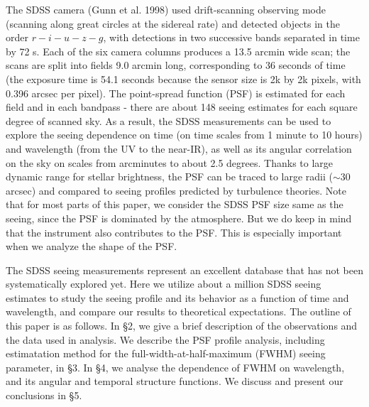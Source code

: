 The SDSS camera (Gunn et al. 1998) used drift-scanning observing mode (scanning along great circles
at the sidereal rate) and detected objects in the order 
$r-i-u-z-g$, with detections in two successive bands separated in time by 72 s. Each of the six camera
columns produces a 13.5 arcmin wide scan; the scans are split into fields 9.0 arcmin long, corresponding
to 36 seconds of time (the exposure time is 54.1 seconds because the sensor size is 2k by 2k pixels,
with 0.396 arcsec per pixel). 
The point-spread function (PSF) is estimated for each field and in each bandpass - there are about 
148 seeing estimates for each square degree of scanned sky. As a result, the SDSS measurements can
be used to explore the seeing dependence on time (on time scales from 1 minute to 10 hours) and 
wavelength (from the UV to the near-IR), as well as its angular correlation on the sky on scales from 
arcminutes to about 2.5 degrees. Thanks to large dynamic range for stellar brightness, the PSF can 
be traced to large radii ($\sim$30 arcsec) and compared to seeing profiles predicted by turbulence
theories. 
Note that for most parts of this paper, we consider the SDSS PSF size
same as the seeing, since the PSF is dominated by the atmosphere. But we do
keep in mind that the instrument also contributes to the PSF. This is
especially important when we analyze the shape of the PSF.

The SDSS seeing measurements represent an excellent database that has not been systematically 
explored yet. Here we utilize about a million SDSS seeing estimates to study the seeing profile 
and its behavior as a function of time and wavelength, and compare our results to theoretical 
expectations. The outline of this paper is as follows. In \S2, we give a brief description of the 
observations and the data used in analysis. We describe the PSF profile analysis, 
including estimatation method for the full-width-at-half-maximum (FWHM) seeing
parameter, in \S3. In \S4, we analyse the dependence of FWHM on wavelength, and its angular 
and temporal structure functions. We discuss and present our conclusions in \S5. 